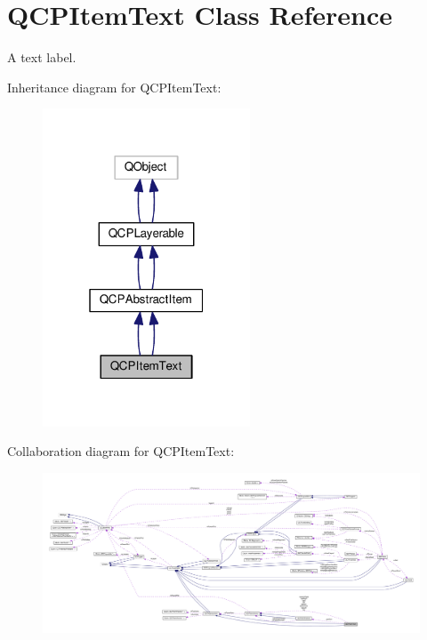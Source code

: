 \hypertarget{class_q_c_p_item_text}{}\section{Q\+C\+P\+Item\+Text Class Reference}
\label{class_q_c_p_item_text}


A text label.  




Inheritance diagram for Q\+C\+P\+Item\+Text\+:\nopagebreak
\begin{figure}[H]
\begin{center}
\leavevmode
\includegraphics[width=175pt]{class_q_c_p_item_text__inherit__graph}
\end{center}
\end{figure}


Collaboration diagram for Q\+C\+P\+Item\+Text\+:\nopagebreak
\begin{figure}[H]
\begin{center}
\leavevmode
\includegraphics[width=350pt]{class_q_c_p_item_text__coll__graph}
\end{center}
\end{figure}
